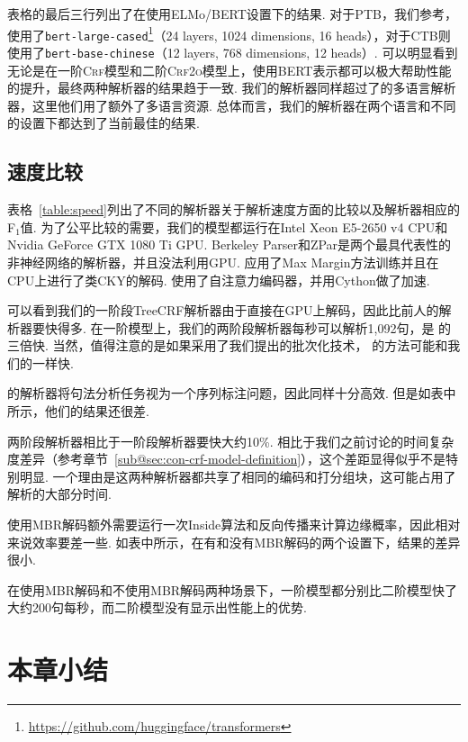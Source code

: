 表格的最后三行列出了在使用ELMo/BERT设置下的结果.
对于PTB，我们参考\citet{kitaev-etal-2019-multilingual}，使用了\texttt{bert-large-cased}\footnote{\url{https://github.com/huggingface/transformers}}（24 layers, 1024 dimensions, 16 heads），对于CTB则使用了\texttt{bert-base-chinese}（12 layers, 768 dimensions, 12 heads）.
可以明显看到无论是在一阶\textsc{Crf}模型和二阶\textsc{Crf2o}模型上，使用BERT表示都可以极大帮助性能的提升，最终两种解析器的结果趋于一致.
我们的解析器同样超过了\citet{kitaev-etal-2019-multilingual}的多语言解析器，这里他们用了额外了多语言资源.
总体而言，我们的解析器在两个语言和不同的设置下都达到了当前最佳的结果.



\subsection{速度比较}
表格~\ref{table:speed}列出了不同的解析器关于解析速度方面的比较以及解析器相应的F$_1$值.
为了公平比较的需要，我们的模型都运行在Intel Xeon E5-2650 v4 CPU和Nvidia GeForce GTX 1080 Ti GPU.
Berkeley Parser和ZPar是两个最具代表性的非神经网络的解析器，并且没法利用GPU.
\citet{stern-etal-2017-minimal}应用了Max Margin方法训练并且在CPU上进行了类CKY的解码.
\citet{kitaev-klein-2018-constituency}使用了自注意力编码器，并用Cython做了加速.

可以看到我们的一阶段TreeCRF解析器由于直接在GPU上解码，因此比前人的解析器要快得多.
在一阶模型上，我们的两阶段解析器每秒可以解析1,092句，是 \citet{kitaev-klein-2018-constituency}的三倍快.
当然，值得注意的是如果采用了我们提出的批次化技术， \citet{stern-etal-2017-minimal,kitaev-klein-2018-constituency}的方法可能和我们的一样快.

\citet{gomez-rodriguez-vilares-2018-constituent}的解析器将句法分析任务视为一个序列标注问题，因此同样十分高效.
但是如表中所示，他们的结果还很差.

两阶段解析器相比于一阶段解析器要快大约10\%.
相比于我们之前讨论的时间复杂度差异（参考章节~\ref{sub@sec:con-crf-model-definition}），这个差距显得似乎不是特别明显.
一个理由是这两种解析器都共享了相同的编码和打分组块，这可能占用了解析的大部分时间.

使用MBR解码额外需要运行一次Inside算法和反向传播来计算边缘概率，因此相对来说效率要差一些.
如表中所示，在有和没有MBR解码的两个设置下，结果的差异很小.

在使用MBR解码和不使用MBR解码两种场景下，一阶模型都分别比二阶模型快了大约200句每秒，而二阶模型没有显示出性能上的优势.

\section{本章小结}\label{sec:con-conclusions}

